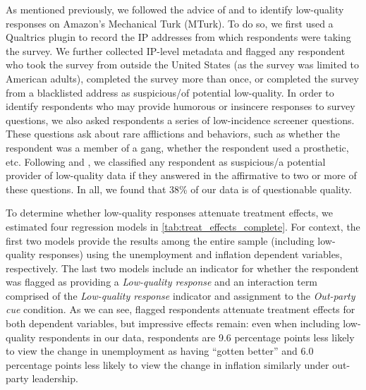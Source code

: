 \documentclass[12pt, letterpaper]{article}
\begin{document}
\begin{doublespace}

As mentioned previously, we followed the advice of \citet{turk_paper} and \citet{kennedy2019shape} to identify low-quality responses on Amazon's Mechanical Turk (MTurk). To do so, we first used a Qualtrics plugin to record the IP addresses from which respondents were taking the survey. We further collected IP-level metadata and flagged any respondent who took the survey from outside the United States (as the survey was limited to American adults), completed the survey more than once, or completed the survey from a blacklisted address as suspicious/of potential low-quality. In order to identify respondents who may provide humorous or insincere responses to survey questions, we also asked respondents a series of low-incidence screener questions. These questions ask about rare afflictions and behaviors, such as whether the respondent was a member of a gang, whether the respondent used a prosthetic, etc. Following \citet{turk_paper} and \citet{lopezhillygus_2018}, we classified any respondent as suspicious/a potential provider of low-quality data if they answered in the affirmative to two or more of these questions. In all, we found that 38\% of our data is of questionable quality. 

To determine whether low-quality responses attenuate treatment effects, we estimated four regression models in \ref{tab:treat_effects_complete}. For context, the first two models provide the results among the entire sample (including low-quality responses) using the unemployment and inflation dependent variables, respectively. The last two models include an indicator for whether the respondent was flagged as providing a \textit{Low-quality response} and an interaction term comprised of the \textit{Low-quality response} indicator and assignment to the \textit{Out-party cue} condition. As we can see, flagged respondents attenuate treatment effects for both dependent variables, but impressive effects remain: even when including low-quality respondents in our data, respondents are 9.6 percentage points less likely to view the change in unemployment as having ``gotten better'' and 6.0 percentage points less likely to view the change in inflation similarly under out-party leadership. 

\end{doublespace}



\clearpage
\end{document}
